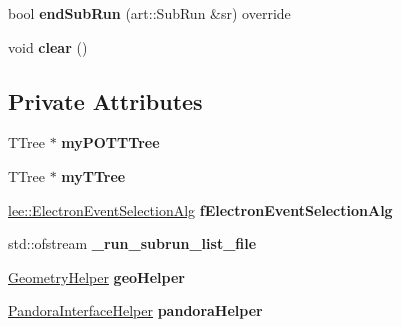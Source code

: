 \begin{DoxyCompactItemize}
\item 
\hypertarget{classlee_1_1ElectronNeutrinoFilter_a85815554f7381b9ececc94a83ee86859}{bool {\bfseries end\-Sub\-Run} (art\-::\-Sub\-Run \&sr) override}\label{classlee_1_1ElectronNeutrinoFilter_a85815554f7381b9ececc94a83ee86859}

\item 
\hypertarget{classlee_1_1ElectronNeutrinoFilter_aff0f9ad8cf9531ac2a743ade4758502c}{void {\bfseries clear} ()}\label{classlee_1_1ElectronNeutrinoFilter_aff0f9ad8cf9531ac2a743ade4758502c}

\end{DoxyCompactItemize}
\subsection*{Private Attributes}
\begin{DoxyCompactItemize}
\item 
\hypertarget{classlee_1_1ElectronNeutrinoFilter_a71f4be7e318ce49ff07a948e17afe40d}{T\-Tree $\ast$ {\bfseries my\-P\-O\-T\-T\-Tree}}\label{classlee_1_1ElectronNeutrinoFilter_a71f4be7e318ce49ff07a948e17afe40d}

\item 
\hypertarget{classlee_1_1ElectronNeutrinoFilter_a0cd8d0a8b3466ad728bd8b520c2fd392}{T\-Tree $\ast$ {\bfseries my\-T\-Tree}}\label{classlee_1_1ElectronNeutrinoFilter_a0cd8d0a8b3466ad728bd8b520c2fd392}

\item 
\hypertarget{classlee_1_1ElectronNeutrinoFilter_a218cb05b2710a8cfaa9021cc7850bb28}{\hyperlink{classlee_1_1ElectronEventSelectionAlg}{lee\-::\-Electron\-Event\-Selection\-Alg} {\bfseries f\-Electron\-Event\-Selection\-Alg}}\label{classlee_1_1ElectronNeutrinoFilter_a218cb05b2710a8cfaa9021cc7850bb28}

\item 
\hypertarget{classlee_1_1ElectronNeutrinoFilter_ac9531a2782934676b4a5c5562da3139c}{std\-::ofstream {\bfseries \-\_\-run\-\_\-subrun\-\_\-list\-\_\-file}}\label{classlee_1_1ElectronNeutrinoFilter_ac9531a2782934676b4a5c5562da3139c}

\item 
\hypertarget{classlee_1_1ElectronNeutrinoFilter_ae709489ed7e674f1e54d7e756058bacf}{\hyperlink{classlee_1_1GeometryHelper}{Geometry\-Helper} {\bfseries geo\-Helper}}\label{classlee_1_1ElectronNeutrinoFilter_ae709489ed7e674f1e54d7e756058bacf}

\item 
\hypertarget{classlee_1_1ElectronNeutrinoFilter_affbf7de91f50382bd10ac94512a6bb54}{\hyperlink{classlee_1_1PandoraInterfaceHelper}{Pandora\-Interface\-Helper} {\bfseries pandora\-Helper}}\label{classlee_1_1ElectronNeutrinoFilter_affbf7de91f50382bd10ac94512a6bb54}


\end{DoxyCompactItemize}
